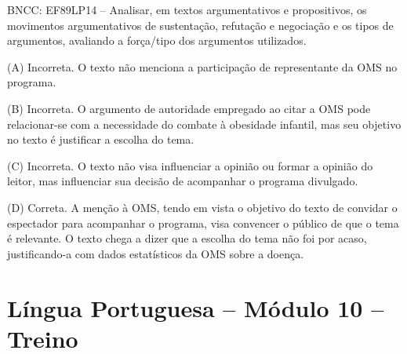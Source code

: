 \begin{enumerate}
BNCC: EF89LP14 -- Analisar, em textos argumentativos e propositivos, os
movimentos argumentativos de sustentação, refutação e negociação e os
tipos de argumentos, avaliando a força/tipo dos argumentos utilizados.

(A) Incorreta. O texto não menciona a participação de representante da
OMS no programa. 

(B) Incorreta. O argumento de autoridade empregado ao
citar a OMS pode relacionar-se com a necessidade do combate à obesidade
infantil, mas seu objetivo no texto é justificar a escolha do tema. 

(C)
Incorreta. O texto não visa influenciar a opinião ou formar a opinião do
leitor, mas influenciar sua decisão de acompanhar o programa divulgado.

(D) Correta. A menção à OMS, tendo em vista o objetivo do texto de
convidar o espectador para acompanhar o programa, visa convencer o
público de que o tema é relevante. O texto chega a dizer que a escolha
do tema não foi por acaso, justificando-a com dados estatísticos da OMS
sobre a doença.
\end{enumerate}

\section*{Língua Portuguesa – Módulo 10 – Treino}

